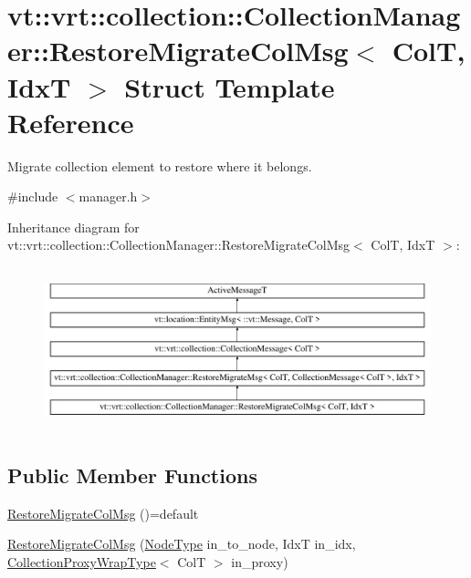\hypertarget{structvt_1_1vrt_1_1collection_1_1_collection_manager_1_1_restore_migrate_col_msg}{}\section{vt\+:\+:vrt\+:\+:collection\+:\+:Collection\+Manager\+:\+:Restore\+Migrate\+Col\+Msg$<$ ColT, IdxT $>$ Struct Template Reference}
\label{structvt_1_1vrt_1_1collection_1_1_collection_manager_1_1_restore_migrate_col_msg}


Migrate collection element to restore where it belongs.  




{\ttfamily \#include $<$manager.\+h$>$}

Inheritance diagram for vt\+:\+:vrt\+:\+:collection\+:\+:Collection\+Manager\+:\+:Restore\+Migrate\+Col\+Msg$<$ ColT, IdxT $>$\+:\begin{figure}[H]
\begin{center}
\leavevmode
\includegraphics[height=4.761905cm]{structvt_1_1vrt_1_1collection_1_1_collection_manager_1_1_restore_migrate_col_msg}
\end{center}
\end{figure}
\subsection*{Public Member Functions}
\begin{DoxyCompactItemize}
\item 
\hyperlink{structvt_1_1vrt_1_1collection_1_1_collection_manager_1_1_restore_migrate_col_msg_a70c06119d41dc7516bff3d8619ad53f0}{Restore\+Migrate\+Col\+Msg} ()=default
\item 
\hyperlink{structvt_1_1vrt_1_1collection_1_1_collection_manager_1_1_restore_migrate_col_msg_aa54ac298acb57290f34ea4dbd6f352f1}{Restore\+Migrate\+Col\+Msg} (\hyperlink{namespacevt_a866da9d0efc19c0a1ce79e9e492f47e2}{Node\+Type} in\+\_\+to\+\_\+node, IdxT in\+\_\+idx, \hyperlink{structvt_1_1vrt_1_1collection_1_1_collection_manager_a56458ed7f9bb22b631b9b3a745f42f94}{Collection\+Proxy\+Wrap\+Type}$<$ ColT $>$ in\+\_\+proxy)
\end{DoxyCompactItemize}
